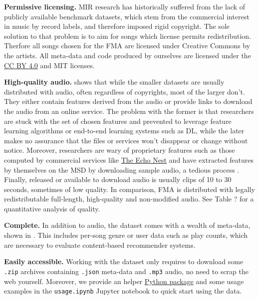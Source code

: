 \documentclass{article}
\newcommand{\todo}[1]{{\color{red} #1 }}
\begin{document}
\textbf{Permissive licensing.} MIR research has historically suffered from the lack of publicly available benchmark datasets, which stem from the commercial interest in music by record labels, and therefore imposed rigid copyright.
The sole solution to that problem is to aim for songs which license permits redistribution.
Therfore all songs chosen for the FMA are licensed under Creative Commons by the artists. All meta-data and code produced by ourselves are licensed under the \href{https://creativecommons.org/licenses/by/4.0)}{
CC BY 4.0} and MIT licenses.

\textbf{High-quality audio.}
 shows that while the smaller datasets are usually distributed with audio, often regardless of copyrights, most of the larger don't.
They either contain features derived from the audio or provide links to download the audio from an online service. The problem with the former is that researchers are stuck with the set of chosen features and prevented to leverage feature learning algorithms or end-to-end learning systems such as DL, while the later makes no assurance that the files or services won't disappear or change without notice.
Moreover, researchers are wary of proprietary features such as those computed by commercial services like \href{http://the.echonest.com/}{The Echo Nest} and have extracted features by themselves on the MSD by downloading sample audio, a tedious process \cite{msd_features}.
Finally, released or available to download audio is usually clips of 10 to 30 seconds, sometimes of low quality.
In comparison, FMA is distributed with legally redistributable full-length, high-quality and non-modified audio. \todo{See Table ? for a quantitative analysis of quality.}

\textbf{Complete.} In addition to audio, the dataset comes with a wealth of meta-data, shown in . This includes per-song genre or user data such as play counts, which are necessary to evaluate content-based recommender systems.

\textbf{Easily accessible.} Working with the dataset only requires to download some \texttt{.zip} archives containing \texttt{.json} meta-data and \texttt{.mp3} audio, no need to scrap the web yourself. Moreover, we provide an helper \href{https://pypi.python.org/pypi/freemusicarchive}{Python package} and some usage examples in the \texttt{usage.ipynb} Jupyter notebook to quick start using the data.
\end{document}
